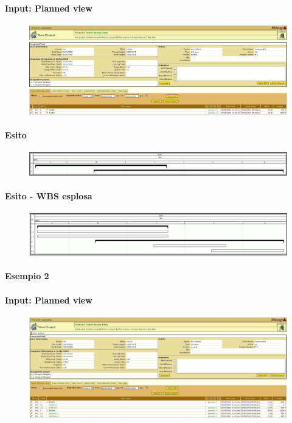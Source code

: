 \paragraph{Input: Planned view}
\begin{figure}[h!]
\centering
\includegraphics[width=\textwidth]{tests/TEST_GANTT/3.2/ComposedTask_data.jpg}
\end{figure}
\newpage

\paragraph{Esito}
\begin{figure}[h!]
\centering
\includegraphics[width=\textwidth]{tests/TEST_GANTT/3.2/ComposedTask_2.jpg}
\end{figure}

\paragraph{Esito - WBS esplosa}
\begin{figure}[h!]
\centering
\includegraphics[width=\textwidth]{tests/TEST_GANTT/3.2/ComposedTask_1.jpg}
\end{figure}
\newpage

\paragraph{Esempio 2}
\paragraph{Input: Planned view}
\begin{figure}[h!]
\centering
\includegraphics[width=\textwidth]{tests/TEST_GANTT/3.2/ComposedTask_data_2.jpg}
\end{figure}
\newpage

